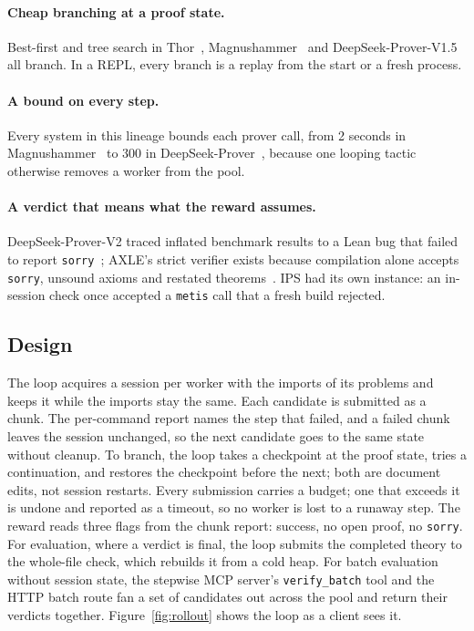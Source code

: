\documentclass[11pt]{article}
\newcommand{\code}[1]{\colorbox{gray!12}{\texttt{\vphantom{Ag}#1}}}
\begin{document}
\paragraph{Cheap branching at a proof state.} Best-first and tree search
in Thor~\cite{jiang2022thor}, Magnushammer~\cite{mikula2024magnushammer}
and DeepSeek-Prover-V1.5~\cite{deepseek2024proverv15} all branch. In a
REPL, every branch is a replay from the start or a fresh process.

\paragraph{A bound on every step.} Every system in this lineage bounds
each prover call, from 2 seconds in
Magnushammer~\cite{mikula2024magnushammer} to 300 in
DeepSeek-Prover~\cite{deepseek2024proverv15}, because one looping tactic
otherwise removes a worker from the pool.

\paragraph{A verdict that means what the reward assumes.}
DeepSeek-Prover-V2 traced inflated benchmark results to a Lean bug that
failed to report \code{sorry}~\cite{deepseek2025proverv2}; AXLE's strict
verifier exists because compilation alone accepts \code{sorry}, unsound
axioms and restated theorems~\cite{xin2026axle}. IPS had its own
instance: an in-session check once accepted a \code{metis} call that a
fresh build rejected.

\subsection{Design}

The loop acquires a session per worker with the imports of its problems
and keeps it while the imports stay the same. Each
candidate is submitted as a chunk. The per-command report names the step
that failed, and a failed chunk leaves the session unchanged, so the next
candidate goes to the same state without cleanup. To branch, the loop
takes a checkpoint at the proof state, tries a continuation, and restores
the checkpoint before the next; both are document edits, not session
restarts. Every submission carries a budget; one that exceeds it is
undone and reported as a timeout, so no worker is lost to a runaway step.
The reward reads three flags from the chunk report: success, no open
proof, no \code{sorry}. For evaluation, where a verdict is final, the
loop submits the completed theory to the whole-file check, which rebuilds
it from a cold heap. For batch evaluation without session state, the
stepwise MCP server's \code{verify\_batch} tool and the HTTP batch route
fan a set of candidates out across the pool and return their verdicts
together. Figure~\ref{fig:rollout} shows the loop as a client sees it.
\end{document}
